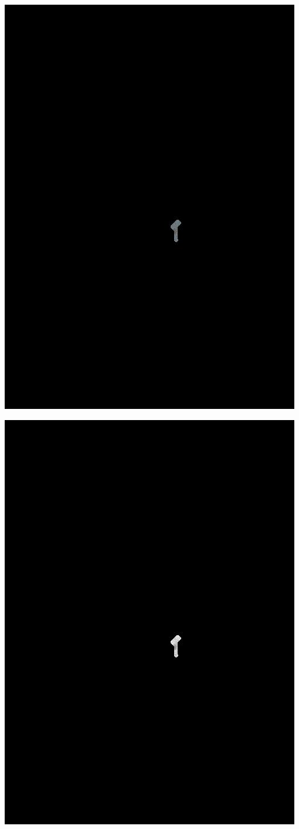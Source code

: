 \begin{Figure}
  \centering
    \includegraphics[width=0.5\columnwidth]{images/im7_mask.jpg}
\end{Figure}

\begin{Figure}
  \centering
    \includegraphics[width=0.5\columnwidth]{images/im7_eye.jpg}
\end{Figure}

